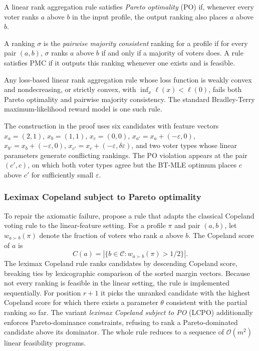 \begin{definition}
\label{def:po_axiom}
A linear rank aggregation rule satisfies \emph{Pareto optimality} (PO) if, whenever every voter ranks $a$ above $b$ in the input profile, the output ranking also places $a$ above $b$.
\end{definition}

\begin{definition}
\label{def:pmc_axiom}
A ranking $\sigma$ is the \emph{pairwise majority consistent} ranking for a profile if for every pair $(a, b)$, $\sigma$ ranks $a$ above $b$ if and only if a majority of voters does. A rule satisfies PMC if it outputs this ranking whenever one exists and is feasible.
\end{definition}

\begin{theorem}
\label{thm:bt_mle_failure}
Any loss-based linear rank aggregation rule whose loss function is weakly convex and nondecreasing, or strictly convex, with $\inf_x \ell(x) < \ell(0)$, fails both Pareto optimality and pairwise majority consistency. The standard Bradley-Terry maximum-likelihood reward model is one such rule.
\end{theorem}

The construction in the proof uses six candidates with feature vectors $x_a = (2,1)$, $x_b = (1,1)$, $x_c = (0,0)$, $x_{a'} = x_a + (-\varepsilon, 0)$, $x_{b'} = x_b + (-\varepsilon, 0)$, $x_{c'} = x_c + (-\varepsilon, \delta\varepsilon)$, and two voter types whose linear parameters generate conflicting rankings. The PO violation appears at the pair $(c', c)$, on which both voter types agree but the BT-MLE optimum places $c$ above $c'$ for sufficiently small $\varepsilon$.

\subsubsection{Leximax Copeland subject to Pareto optimality}
\label{sec:lcpo}

To repair the axiomatic failure, \citet{ge2024axioms} propose a rule that adapts the classical Copeland voting rule to the linear-feature setting. For a profile $\pi$ and pair $(a, b)$, let $w_{a \succ b}(\pi)$ denote the fraction of voters who rank $a$ above $b$. The Copeland score of $a$ is
\[
C(a) = |\{b \in \mathcal{C} : w_{a \succ b}(\pi) > 1/2 \}|.
\]
The leximax Copeland rule ranks candidates by descending Copeland score, breaking ties by lexicographic comparison of the sorted margin vectors. Because not every ranking is feasible in the linear setting, the rule is implemented sequentially. For position $r + 1$ it picks the unranked candidate with the highest Copeland score for which there exists a parameter $\theta$ consistent with the partial ranking so far. The variant \emph{leximax Copeland subject to PO} (LCPO) additionally enforces Pareto-dominance constraints, refusing to rank a Pareto-dominated candidate above its dominator. The whole rule reduces to a sequence of $\mathcal{O}(m^2)$ linear feasibility programs.

